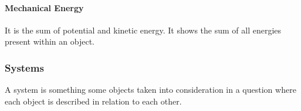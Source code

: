 \documentclass{article} %
\begin{document}
            \paragraph{Mechanical Energy}
            It is the sum of potential and kinetic energy. It shows the sum of all energies present within an object.
        \subsubsection{Systems}
            A system is something some objects taken into consideration in a question where each object is described in relation to each other.
\end{document}
